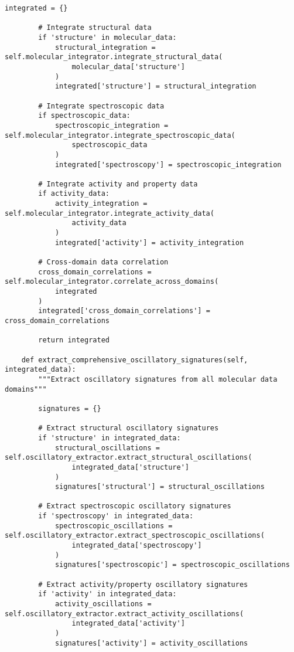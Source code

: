 \documentclass[12pt,a4paper]{article}
\begin{document}
\begin{algorithm}
\begin{algorithmic}[1]
\begin{lstlisting}[style=pythonstyle, caption=Core Molecule-to-Drip Implementation for Comprehensive Chemical Analysis]
        integrated = {}
        
        # Integrate structural data
        if 'structure' in molecular_data:
            structural_integration = self.molecular_integrator.integrate_structural_data(
                molecular_data['structure']
            )
            integrated['structure'] = structural_integration
        
        # Integrate spectroscopic data
        if spectroscopic_data:
            spectroscopic_integration = self.molecular_integrator.integrate_spectroscopic_data(
                spectroscopic_data
            )
            integrated['spectroscopy'] = spectroscopic_integration
        
        # Integrate activity and property data
        if activity_data:
            activity_integration = self.molecular_integrator.integrate_activity_data(
                activity_data
            )
            integrated['activity'] = activity_integration
        
        # Cross-domain data correlation
        cross_domain_correlations = self.molecular_integrator.correlate_across_domains(
            integrated
        )
        integrated['cross_domain_correlations'] = cross_domain_correlations
        
        return integrated
    
    def extract_comprehensive_oscillatory_signatures(self, integrated_data):
        """Extract oscillatory signatures from all molecular data domains"""
        
        signatures = {}
        
        # Extract structural oscillatory signatures
        if 'structure' in integrated_data:
            structural_oscillations = self.oscillatory_extractor.extract_structural_oscillations(
                integrated_data['structure']
            )
            signatures['structural'] = structural_oscillations
        
        # Extract spectroscopic oscillatory signatures
        if 'spectroscopy' in integrated_data:
            spectroscopic_oscillations = self.oscillatory_extractor.extract_spectroscopic_oscillations(
                integrated_data['spectroscopy']
            )
            signatures['spectroscopic'] = spectroscopic_oscillations
        
        # Extract activity/property oscillatory signatures
        if 'activity' in integrated_data:
            activity_oscillations = self.oscillatory_extractor.extract_activity_oscillations(
                integrated_data['activity']
            )
            signatures['activity'] = activity_oscillations
        

\end{lstlisting}
\end{algorithmic}
\end{algorithm}
\end{document}
